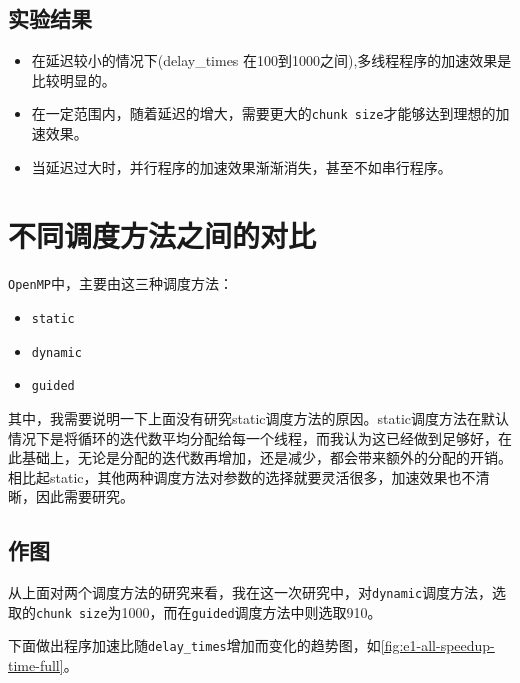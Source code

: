 \documentclass[forprint]{myreport}
\begin{document}
\subsection{实验结果}

\begin{itemize}
    \item 在延迟较小的情况下(delay\_times 在100到1000之间),多线程程序的加速效果是比较明显的。
    \item 在一定范围内，随着延迟的增大，需要更大的\texttt{chunk size}才能够达到理想的加速效果。
    \item 当延迟过大时，并行程序的加速效果渐渐消失，甚至不如串行程序。
\end{itemize}

\section{不同调度方法之间的对比}

\texttt{OpenMP}中，主要由这三种调度方法：

\begin{itemize}
    \item \texttt{static}
    \item \texttt{dynamic}
    \item \texttt{guided}
\end{itemize}

其中，我需要说明一下上面没有研究static调度方法的原因。static调度方法在默认情况下是将循环的迭代数平均分配给每一个线程，而我认为这已经做到足够好，在此基础上，无论是分配的迭代数再增加，还是减少，都会带来额外的分配的开销。相比起static，其他两种调度方法对参数的选择就要灵活很多，加速效果也不清晰，因此需要研究。

\subsection{作图}

从上面对两个调度方法的研究来看，我在这一次研究中，对\texttt{dynamic}调度方法，选取的\texttt{chunk size}为1000，而在\texttt{guided}调度方法中则选取910。

下面做出程序加速比随\texttt{delay\_times}增加而变化的趋势图，如\autoref{fig:e1-all-speedup-time-full}。
\end{document}
